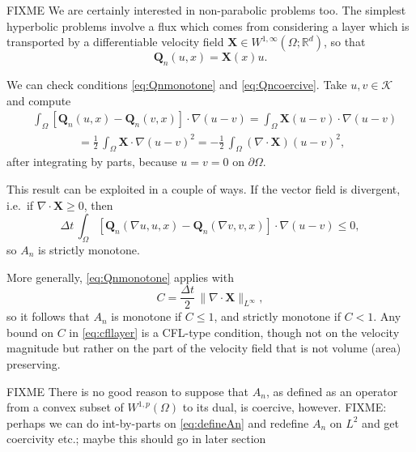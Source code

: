 \documentclass[final,leqno,onefignum,onetabnum]{siamltex1213bueler}
\newcommand\bQ{\mathbf{Q}}
\newcommand\bX{\mathbf{X}}
\newcommand{\Div}{\nabla\cdot}
\renewcommand{\grad}{\nabla}
\newcommand\RR{\mathbb{R}}
\begin{document}
FIXME  We are certainly interested in non-parabolic problems too.  The simplest hyperbolic problems involve a flux which comes from considering a layer which is transported by a differentiable velocity field $\bX \in W^{1,\infty}(\Omega;\RR^d)$, so that
\begin{equation}
  \bQ_n(u,x) = \bX(x) u.
\end{equation}

We can check conditions \eqref{eq:Qnmonotone} and \eqref{eq:Qncoercive}.  Take $u,v\in\mathcal{K}$ and compute
\begin{align*}
   &\int_\Omega \left[\bQ_n(u,x) - \bQ_n(v,x)\right] \cdot \grad (u - v) = \int_\Omega \bX (u-v) \cdot \grad (u - v) \\
   &\qquad\qquad = \frac{1}{2}\,\int_\Omega \bX \cdot \grad (u - v)^2 = - \frac{1}{2}\,\int_\Omega \left(\Div\bX\right) (u - v)^2,
\end{align*}
after integrating by parts, because $u=v=0$ on $\partial \Omega$.

This result can be exploited in a couple of ways.  If the vector field is divergent, i.e.~if $\Div\bX\ge 0$, then
\begin{equation}
\Delta t\, \int_\Omega \left[\bQ_n(\grad u,u,x) - \bQ_n(\grad v,v,x)\right] \cdot \grad (u - v) \le 0,
\end{equation}
so $A_n$ is strictly monotone.

More generally, \eqref{eq:Qnmonotone} applies with 
\begin{equation}
C = \frac{\Delta t}{2}\,\|\Div\bX\|_{L^\infty}, \label{eq:cfllayer}
\end{equation}
so it follows that $A_n$ is monotone if $C\le 1$, and strictly monotone if $C<1$.  Any bound on $C$ in \eqref{eq:cfllayer} is a CFL-type condition, though not on the velocity magnitude but rather on the part of the velocity field that is not volume (area) preserving.

FIXME There is no good reason to suppose that $A_n$, as defined as an operator from a convex subset of $W^{1,p}(\Omega)$ to its dual, is coercive, however.  FIXME: perhaps we can do int-by-parts on \eqref{eq:defineAn} and redefine $A_n$ on $L^2$ and get coercivity etc.; maybe this should go in later section
\end{document}

